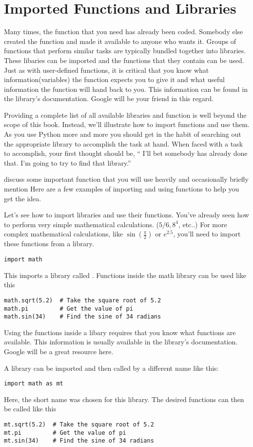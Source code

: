 \section{Imported Functions and Libraries}
Many times, the function that you need has already been coded. Somebody
else created the function and made it available to anyone
who wants it.  Groups of functions that perform similar tasks are
typically bundled together into libraries. These libaries can be
imported and the functions that they contain can be used.  Just as
with user-defined functions, it is critical that you know what
information(variables) the function expects you to give it and what
useful information the function will hand back to you.  This
information can be found in the library's documentation.  Google will
be your friend in this regard.

Providing a complete list of all available libraries and function is well beyond
the scope of this book. Instead, we'll illustrate how to import
functions and use them.  As you use Python more and more you
should get in the habit of searching out the appropriate library to
accomplish the task at hand. When faced with a task to accomplish,
your first thought should be, `` I'll bet somebody has already done that.
I'm going to try to find that library.''

discuss some important function
that you will use heavily and occasionally briefly mention 
Here are a few examples of importing and using functions to help you
get the idea.  

Let's see how to import libraries and use their functions. You've
already seen how to perform very simple mathematical calculations. ($5/6, 8^4$,
etc..)  For more complex
mathematical calculations, like $\sin(\frac{\pi}{2})$ or $e^{2.5}$,
you'll need to import these functions from a library.
\begin{Verbatim}
import math
\end{Verbatim}
This imports a library called .  Functions inside the
math library can be used like this
\begin{Verbatim}
math.sqrt(5.2)  # Take the square root of 5.2
math.pi         # Get the value of pi
math.sin(34)    # Find the sine of 34 radians
\end{Verbatim}
Using the functions inside a libary requires that you know what
functions are available.  This information is usually available in the
library's documentation.  Google will be a great resource here.

A library can be imported and then called by a different name like
this:
\begin{Verbatim}
import math as mt
\end{Verbatim}
Here, the short name  was chosen for this library.
The desired functions can then be called like this
\begin{Verbatim}
mt.sqrt(5.2)  # Take the square root of 5.2
mt.pi         # Get the value of pi
mt.sin(34)    # Find the sine of 34 radians
\end{Verbatim}

